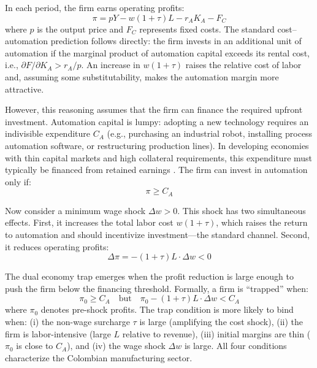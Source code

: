 \documentclass[5p,times,authoryear]{elsarticle}
\begin{document}
In each period, the firm earns operating profits:
\begin{equation}
\label{eq:profits}
\pi = pY - w(1+\tau)L - r_A K_A - F_C
\end{equation}
where $p$ is the output price and $F_C$ represents fixed costs. The standard cost--automation prediction follows directly: the firm invests in an additional unit of automation if the marginal product of automation capital exceeds its rental cost, i.e., $\partial F / \partial K_A > r_A / p$. An increase in $w(1+\tau)$ raises the relative cost of labor and, assuming some substitutability, makes the automation margin more attractive.

However, this reasoning assumes that the firm can finance the required upfront investment. Automation capital is lumpy: adopting a new technology requires an indivisible expenditure $C_A$ (e.g., purchasing an industrial robot, installing process automation software, or restructuring production lines). In developing economies with thin capital markets and high collateral requirements, this expenditure must typically be financed from retained earnings \citep{busso2020}. The firm can invest in automation only if:
\begin{equation}
\label{eq:finance_constraint}
\pi \geq C_A
\end{equation}

Now consider a minimum wage shock $\Delta w > 0$. This shock has two simultaneous effects. First, it increases the total labor cost $w(1+\tau)$, which raises the return to automation and should incentivize investment---the standard channel. Second, it reduces operating profits:
\begin{equation}
\label{eq:profit_reduction}
\Delta \pi = -(1+\tau) L \cdot \Delta w < 0
\end{equation}

The dual economy trap emerges when the profit reduction is large enough to push the firm below the financing threshold. Formally, a firm is ``trapped'' when:
\begin{equation}
\label{eq:trap_condition}
\pi_0 \geq C_A \quad \text{but} \quad \pi_0 - (1+\tau)L \cdot \Delta w < C_A
\end{equation}
where $\pi_0$ denotes pre-shock profits. The trap condition is more likely to bind when: (i) the non-wage surcharge $\tau$ is large (amplifying the cost shock), (ii) the firm is labor-intensive (large $L$ relative to revenue), (iii) initial margins are thin ($\pi_0$ is close to $C_A$), and (iv) the wage shock $\Delta w$ is large. All four conditions characterize the Colombian manufacturing sector.
\end{document}
